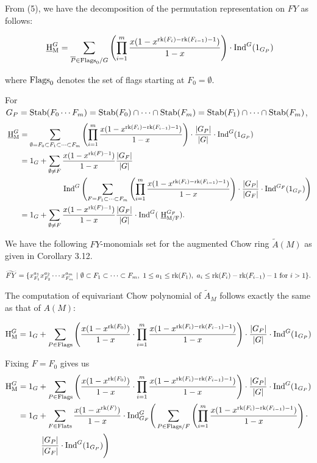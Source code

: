 \documentclass[10pt]{article}
\newcommand{\ind}{\text{\normalfont Ind}}
\newcommand{\stab}{\text{\normalfont Stab}}
\newcommand{\hilbM}{\normalfont\text{ \underline{H}}_\text{M}}
\newcommand{\aughilbM}{\normalfont\text{H}_\text{M}}
\newcommand{\rank}{\normalfont\text{rk}}
\newcommand{\flats}{\normalfont\text{Flats}}
\newcommand{\flags}{\normalfont\text{Flags}}
\newcommand{\hilbMmodF}{\normalfont\text{ \underline{H}}_\text{M/F}}
\theoremstyle{remark}
\begin{document}
From (5), we have the decomposition of the permutation representation on $FY$ as follows:

$$\hilbM^G = \sum_{\overline{P}\in\flags_0/G}\left(\prod_{i=1}^m{
    \frac{x(1-x^{\rank(F_i)-\rank(F_{i-1})-1})}{1-x}}\right)\cdot\ind^G(1_{G_P})$$
    
where $\flags_0$ denotes the set of flags starting at $F_0=\emptyset$.

\hrulefill

For $G_P= \stab(F_0\cdots F_m) = \stab(F_0)\cap\cdots\cap\stab(F_m) = \stab(F_1)\cap\cdots\cap\stab(F_m)$,
\begin{align*}
    \hilbM^G &= \sum_{\emptyset = F_0\subset F_1\subset \cdots\subset F_m}\left(\prod_{i=1}^m{
    \frac{x(1-x^{\rank(F_i)-\rank(F_{i-1})-1})}{1-x}}\right)\cdot\frac{|G_P|}{|G|}\cdot\ind^G(1_{G_P})\\
    &= 1_G + \sum_{\emptyset \neq F}\frac{x(1-x^{\rank(F)-1})}{1-x}
    \frac{|G_F|}{|G|}\\
    &\hspace{20mm}\ind^G\left(\sum_{F = F_1\subset \cdots\subset F_m}\left(\prod_{i=1}^m{
        \frac{x(1-x^{\rank(F_i)-\rank(F_{i-1})-1})}{1-x}}\right)\cdot
    \frac{|G_P|}{|G_F|}\cdot \ind^{G_F}(1_{G_P})\right)\\
    &= 1_G + \sum_{\emptyset \neq F}{\frac{x(1-x^{\rank(F)-1})}{1-x}
    \frac{|G_F|}{|G|}\cdot\ind^G(\hilbMmodF^{G_F})}.
\end{align*}

\hrulefill

We have the following $FY$-monomials set for the augmented Chow ring
$\widetilde{A}(M)$
as given in \cite{liao2022stembridgecodeschowrings}
Corollary 3.12.

$\widetilde{FY} = \{x_{F_1}^{a_1}x_{F_2}^{a_2}\cdots x_{F_m}^{a_m}\ 
|\ \emptyset\subset F_1\subset\cdots\subset F_m,\ 1\leq a_1\leq \rank(F_1)
,\ a_i\leq\rank(F_i)-\rank(F_{i-1})-1\ \text{for } i>1\}.$

The computation of equivariant Chow polynomial of $\widetilde{A}_M$
follows exactly the same as that of $A(M)$:

$$\aughilbM^G = 1_G + \sum_{P\in \flags}
{\left(\frac{x(1-x^{\rank(F_0)})}{1-x}
\cdot\prod_{i=1}^m{\frac{x(1-x^{\rank(F_i)-\rank(F_{i-1})-1})}{1-x}}\right)
\cdot\frac{|G_P|}{|G|}\cdot\ind^G(1_{G_P})}$$

Fixing $F=F_0$ gives us
\begin{align*}
    \aughilbM^G &= 1_G + \sum_{P\in \flags}
    \left(\frac{x(1-x^{\rank(F_0)})}{1-x}
    \cdot\prod_{i=1}^m{\frac{x(1-x^{\rank(F_i)-\rank(F_{i-1})-1})}{1-x}}\right)\cdot\frac{|G_P|}{|G|}\cdot\ind^G(1_{G_P}) \\
    &= 1_G + \sum_{F\in \flats}
    \frac{x(1-x^{\rank(F)})}{1-x}
    \cdot\ind_{G_F}^G \Bigg(\sum_{P\in\flags/F}
    \left(\prod_{i=1}^m{\frac{x(1-x^{\rank(F_i)-\rank(F_{i-1})-1})}{1-x}}\right) \cdot \\
    &\hspace*{10mm}\frac{|G_P|}{|G_F|}\cdot\ind^G(1_{G_P})\Bigg)
\end{align*}



\newpage
\printbibliography
\end{document}
